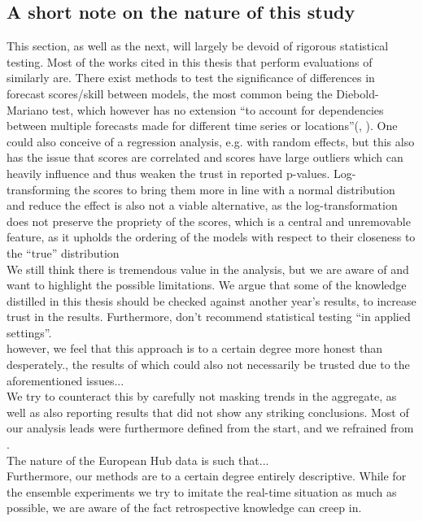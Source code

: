 \subsection{A short note on the nature of this study}
This section, as well as the next, will largely be devoid of rigorous statistical testing. Most of the works cited in this thesis that perform evaluations of similarly are. There exist methods to test the significance of differences in forecast scores/skill between models, the most common being the Diebold-Mariano test, which however has no extension ``to account for dependencies between multiple forecasts made for different time series or locations''(\cite{bracher_evaluating_2021}, \cite{diebold_comparing_1995}). One could also conceive of a regression analysis, e.g. with random effects, but this also has the issue that scores are correlated and scores have large outliers which can heavily influence and thus weaken the trust in reported p-values. Log-transforming the scores to bring them more in line with a normal distribution and reduce the effect is also not a viable alternative, as the log-transformation does not preserve the propriety of the scores, which is a central and unremovable feature, as it upholds the ordering of the models with respect to their closeness to the ``true'' distribution \\ 
We still think there is tremendous value in the analysis, but we are aware of and want to highlight the possible limitations. We argue that some of the knowledge distilled in this thesis should be checked against another year's results, to increase trust in the results. Furthermore, \cite{bosse_epiforecastsscoringutils_2022} don't recommend statistical testing ``in applied settings''.\\ 
however, we feel that this approach is to a certain degree more honest than desperately., the results of which could also not necessarily be trusted due to the aforementioned issues...\\
We try to counteract this by carefully not masking trends in the aggregate, as well as also reporting results that did not show any striking conclusions. Most of our analysis leads were furthermore defined from the start, and we refrained from .\\
The nature of the European Hub data is such that...\\
Furthermore, our methods are to a certain degree entirely descriptive. While for the ensemble experiments we try to imitate the real-time situation as much as possible, we are aware of the fact retrospective knowledge can creep in.\\
